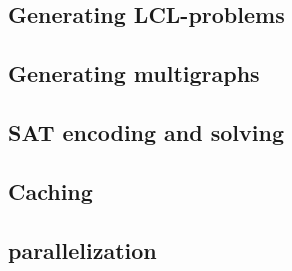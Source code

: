 



\subsection{Generating LCL-problems}
\subsection{Generating multigraphs}

\subsection{SAT encoding and solving}
\subsection{Caching}

\subsection{parallelization}

